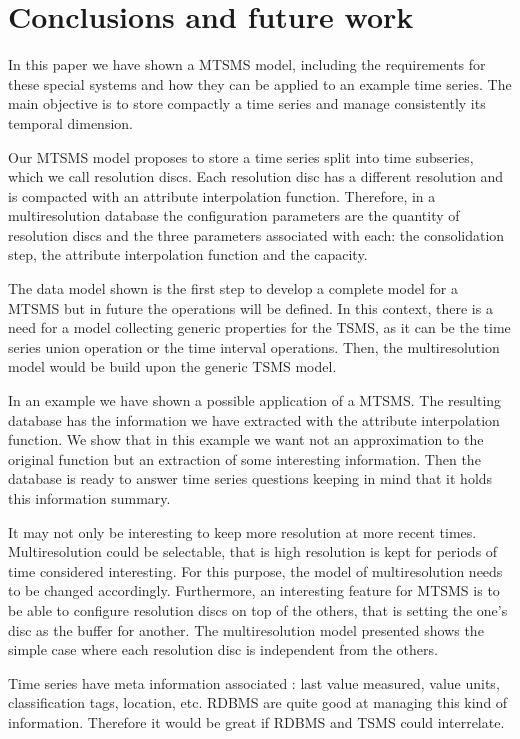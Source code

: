 \section{Conclusions and future work} 

In this paper we have shown a MTSMS model, including the requirements
for these special systems and how they can be applied to an example
time series. The main objective is to store compactly a time series
and manage consistently its temporal dimension.

Our MTSMS model proposes to store a time series split into time
subseries, which we call resolution discs.  Each resolution disc has a
different resolution and is compacted with an attribute interpolation
function. Therefore, in a multiresolution database the configuration
parameters are the quantity of resolution discs and the three
parameters associated with each: the consolidation step, the attribute
interpolation function and the capacity.

The data model shown is the first step to develop a complete model for
a MTSMS but in future the operations will be defined. In this context,
there is a need for a model collecting generic properties for the
TSMS, as it can be the time series union operation or the time
interval operations. Then, the multiresolution model would be build
upon the generic TSMS model.

In an example we have shown a possible application of a MTSMS. The
resulting database has the information we have extracted with the
attribute interpolation function. We show that in this example we want
not an approximation to the original function but an extraction of
some interesting information. Then the database is ready to answer
time series questions keeping in mind that it holds this information
summary.

It may not only be interesting to keep more resolution at more recent
times. Multiresolution could be selectable, that is high resolution is
kept for periods of time considered interesting. For this purpose, the
model of multiresolution needs to be changed accordingly. Furthermore,
an interesting feature for MTSMS is to be able to configure resolution
discs on top of the others, that is setting the one's disc as the
buffer for another. The multiresolution model presented shows the
simple case where each resolution disc is independent from the others.

Time series have meta information associated \cite{dreyer94}: last
value measured, value units, classification tags, location, etc. RDBMS
are quite good at managing this kind of information. Therefore it
would be great if RDBMS and TSMS could interrelate.

